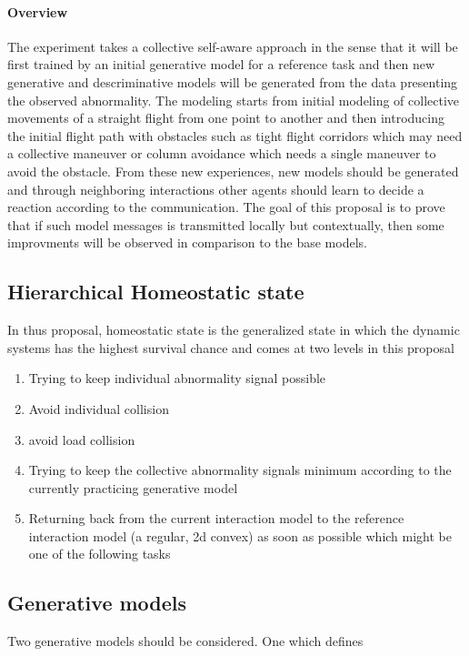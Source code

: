 \documentclass{article}
\begin{document}
		\paragraph{Overview} The experiment takes a collective self-aware approach in the sense that it will be first trained by an initial generative model for a reference task and then new generative and descriminative models will be generated from the data presenting the observed abnormality. The modeling starts from initial modeling of collective movements of a straight flight from one point to another and then introducing the initial flight path with obstacles such as tight flight corridors which may need a collective maneuver or column avoidance which needs a single maneuver to avoid the obstacle. From these new experiences, new models should be generated and through neighboring interactions other agents should learn to decide a reaction according to the communication. The goal of this proposal is to prove that if such model messages is transmitted locally but contextually, then some improvments will be observed in comparison to the base models.   
		
		\subsection{Hierarchical Homeostatic state}\label{sec:hierarchical-homeostatic-state} 
			In thus proposal, homeostatic state is the generalized state in which the dynamic systems has the highest survival chance and comes at two levels in this proposal
			\begin{enumerate}
				\item Trying to keep individual abnormality signal possible
				\item Avoid individual collision 
				\item avoid load collision
				\item Trying to keep the collective abnormality signals minimum according to the currently practicing generative model 
				\item Returning back from the current interaction model to the reference  interaction model (a regular, 2d convex) as soon as possible which might be one of the following tasks
			\end{enumerate}
	
		\subsection{Generative models}\label{sec:generative-collective-models}
			Two generative models should be considered. One which defines 
\end{document}
